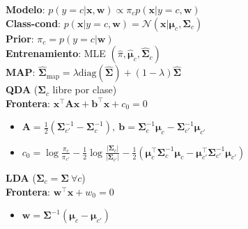 \documentclass[11pt, a4paper]{article}
\newcommand{\w}{\mathbf{w}}
\newcommand{\x}{\mathbf{x}}
\begin{document}
\hfill
\begin{minipage}[t]{0.325\textwidth}
    \vspace{0pt}
    \begin{tcolorbox}[formulabox=GDA, colframe=softRed]
        \textbf{Modelo}: $p(y=c|\x, \w) \propto \pi_c p(\x | y=c, \mathbf{w})$ \\
        \textbf{Class-cond}: $p(\x | y=c, \mathbf{w})=\mathcal{N}(\x | \boldsymbol{\mu}_c, \boldsymbol{\Sigma}_c)$ \\
        \textbf{Prior}: $\pi_c = p(y=c|\w)$ \\
        \textbf{Entrenamiento}: MLE $(\hat{\pi}, \hat{\boldsymbol{\mu}}_c, \hat{\boldsymbol{\Sigma}}_c)$ \\
        \textbf{MAP}: $\hat{\boldsymbol{\Sigma}}_\text{map}= \lambda \text{diag}(\hat{\boldsymbol{\Sigma}}) + (1-\lambda)\hat{\boldsymbol{\Sigma}}$ \\
        \vspace{-2mm}
        \tcbline
        \vspace{-2mm}
        \textbf{QDA} ($\boldsymbol{\Sigma}_c$ libre por clase)\\
        \textbf{Frontera}: $\x^\top\mathbf{A}\x + \mathbf{b}^\top\x + c_0 = 0$\\
        \begin{itemize}
            \item $\mathbf{A} = \tfrac{1}{2}(\boldsymbol{\Sigma}_{c'}^{-1}-\boldsymbol{\Sigma}_c^{-1}), \ \mathbf{b} = \boldsymbol{\Sigma}_c^{-1}\boldsymbol{\mu}_c - \boldsymbol{\Sigma}_{c'}^{-1}\boldsymbol{\mu}_{c'}$
            \item $c_0 = \log\tfrac{\pi_c}{\pi_{c'}} - \tfrac{1}{2}\log\tfrac{|\boldsymbol{\Sigma}_c|}{|\boldsymbol{\Sigma}_{c'}|} - \tfrac{1}{2}(\boldsymbol{\mu}_c^\top\boldsymbol{\Sigma}_c^{-1}\boldsymbol{\mu}_c - \boldsymbol{\mu}_{c'}^\top\boldsymbol{\Sigma}_{c'}^{-1}\boldsymbol{\mu}_{c'})$
        \end{itemize}
        \vspace{-2mm}
        \tcbline
        \vspace{-2mm}
        \textbf{LDA} ($\boldsymbol{\Sigma}_c = \boldsymbol{\Sigma}\ \forall c$) \\
        \textbf{Frontera}: $\w^\top\x + w_0 = 0$\\
        \begin{itemize}
            \item $\w = \boldsymbol{\Sigma}^{-1}(\boldsymbol{\mu}_c - \boldsymbol{\mu}_{c'})$

\end{itemize}
\end{tcolorbox}
\end{minipage}
\end{document}

